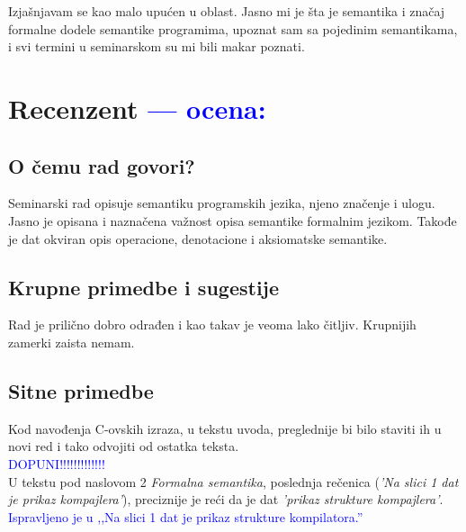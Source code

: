 \documentclass[a4paper]{report}
\newcommand{\odgovor}[1]{\textcolor{blue}{#1}}
\begin{document}
Izjašnjavam se kao malo upućen u oblast. Jasno mi je šta je semantika i značaj formalne dodele semantike programima, upoznat sam sa pojedinim semantikama, i
svi termini u seminarskom su mi bili makar poznati.  


\chapter{Recenzent \odgovor{--- ocena:} }


\section{O čemu rad govori?}
Seminarski rad opisuje semantiku programskih jezika, njeno značenje i ulogu. Jasno je opisana i naznačena važnost opisa semantike formalnim jezikom. Takođe je dat okviran opis operacione, denotacione i aksiomatske semantike. 

\section{Krupne primedbe i sugestije}

Rad je prilično dobro odrađen i kao takav je veoma lako čitljiv. Krupnijih zamerki zaista nemam.

\section{Sitne primedbe}
Kod navođenja C-ovskih izraza, u tekstu uvoda, preglednije bi bilo staviti ih u novi red i tako odvojiti od ostatka teksta. \\
\odgovor{DOPUNI!!!!!!!!!!!!!}\\

U tekstu pod naslovom 2 \emph{Formalna semantika}, poslednja rečenica (\emph{'Na slici 1 dat je prikaz kompajlera'}), preciznije je reći da je dat \emph{'prikaz strukture kompajlera'}.\\
\odgovor{Ispravljeno je u ,,Na slici 1 dat je prikaz strukture kompilatora.''}\\
\end{document}
